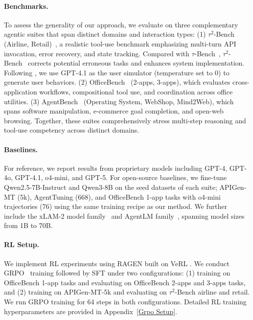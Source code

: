 \paragraph{Benchmarks.}
To assess the generality of our approach, we evaluate on three complementary agentic suites that span distinct domains and interaction types: (1) $\tau^2$-Bench (Airline, Retail)~\citep{barres2025tau}, a realistic tool-use benchmark emphasizing multi-turn API invocation, error recovery, and state tracking. Compared with $\tau$-Bench~\citep{yao2024tau}, $\tau^2$-Bench~\citep{barres2025tau} corrects potential erroneous tasks and enhances system implementation. Following \citep{barres2025tau}, we use GPT-4.1 as the user simulator (temperature set to 0) to generate user behaviors.
(2) OfficeBench~\citep{wang2024officebench} (2-apps, 3-apps), which evaluates cross-application workflows, compositional tool use, and coordination across office utilities.
(3) AgentBench~\citep{liu2023agentbench} (Operating System, WebShop, Mind2Web), which spans software manipulation, e-commerce goal completion, and open-web browsing.
Together, these suites comprehensively stress multi-step reasoning and tool-use competency across distinct domains.



\paragraph{Baselines.}
For reference, we report results from proprietary models including GPT-4, GPT-4o, GPT-4.1, o4-mini, and GPT-5. For open-source baselines, we fine-tune Qwen2.5-7B-Instruct and Qwen3-8B on the seed datasets of each suite; APIGen-MT (5k), AgentTuning (668), and OfficeBench 1-app tasks with o4-mini trajectories (76) using the same training recipe as our method. We further include the xLAM-2 model family~\citep{prabhakar2025apigen} and AgentLM family~\citep{zeng2023agenttuningenablinggeneralizedagent}, spanning model sizes from 1B to 70B.



\paragraph{RL Setup.} We implement RL experiments using RAGEN \citep{wang2025ragen} built on VeRL \citep{sheng2024hybridflow}. 
We conduct GRPO~\citep{shao2024deepseekmath} training followed by SFT under two configurations: (1) training on OfficeBench 1-app tasks and evaluating on OfficeBench 2-apps and 3-apps tasks, and (2) training on APIGen-MT-5k and evaluating on $\tau^2$-Bench airline and retail. We run GRPO training for 64 steps in both configurations. Detailed RL training hyperparameters are provided in Appendix~\ref{Grpo Setup}.


